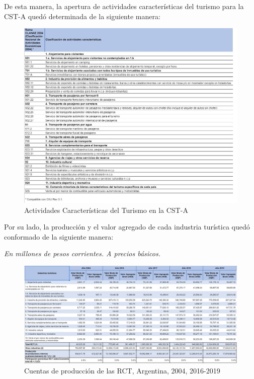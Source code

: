 \documentclass[
  openany]{book}
\begin{document}
De esta manera, la apertura de actividades características del turismo para la CST-A quedó determinada de la siguiente manera:

\begin{figure}

{\centering \includegraphics[width=0.8\linewidth]{imagenes/figura1.3} 

}

\caption{Actividades Características del Turismo en la CST-A}\label{fig:activcst}
\end{figure}

Por su lado, la producción y el valor agregado de cada industria turística quedó conformado de la siguiente manera:

\emph{En millones de pesos corrientes. A precios básicos.}

\begin{figure}

{\centering \includegraphics[width=0.8\linewidth]{imagenes/figura1.4} 

}

\caption{Cuentas de producción de las RCT, Argentina, 2004, 2016-2019}\label{fig:cst}
\end{figure}
\end{document}
